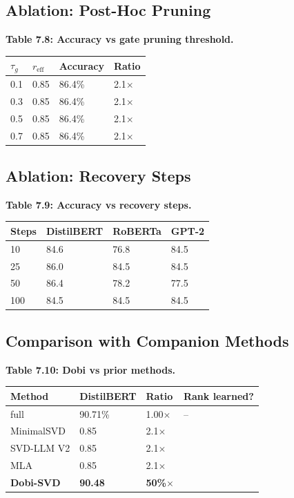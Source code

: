 \subsection{Ablation: Post-Hoc Pruning}

\textbf{Table 7.8: Accuracy vs gate pruning threshold.}

\begin{table}[H]
\centering
\small
\begin{tabular}{llll}
\toprule
\textbf{$\tau_g$} & \textbf{$r_\text{eff}$} & \textbf{Accuracy} & \textbf{Ratio} \\
\midrule
0.1 & 0.85 & 86.4\% & 2.1$\times$ \\
0.3 & 0.85 & 86.4\% & 2.1$\times$ \\
0.5 & 0.85 & 86.4\% & 2.1$\times$ \\
0.7 & 0.85 & 86.4\% & 2.1$\times$ \\
\bottomrule
\end{tabular}
\end{table}

\subsection{Ablation: Recovery Steps}

\textbf{Table 7.9: Accuracy vs recovery steps.}

\begin{table}[H]
\centering
\small
\begin{tabular}{llll}
\toprule
\textbf{Steps} & \textbf{DistilBERT} & \textbf{RoBERTa} & \textbf{GPT-2} \\
\midrule
10 & 84.6 & 76.8 & 84.5 \\
25 & 86.0 & 84.5 & 84.5 \\
50 & 86.4 & 78.2 & 77.5 \\
100 & 84.5 & 84.5 & 84.5 \\
\bottomrule
\end{tabular}
\end{table}

\subsection{Comparison with Companion Methods}

\textbf{Table 7.10: Dobi vs prior methods.}

\begin{table}[H]
\centering
\small
\begin{tabular}{llll}
\toprule
\textbf{Method} & \textbf{DistilBERT} & \textbf{Ratio} & \textbf{Rank learned?} \\
\midrule
full & 90.71\% & 1.00$\times$ & -- \\
MinimalSVD & 0.85 & 2.1$\times$ &  \\
SVD-LLM V2 & 0.85 & 2.1$\times$ &  \\
MLA & 0.85 & 2.1$\times$ &  \\
\textbf{Dobi-SVD} & \textbf{90.48} & \textbf{50\%$\times$} & \textbf{ } \\
\bottomrule
\end{tabular}
\end{table}

